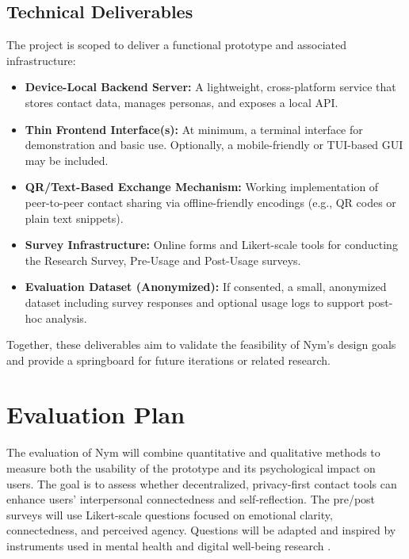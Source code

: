 \documentclass{imc-inf}
\begin{document}
\section{Technical Deliverables}

The project is scoped to deliver a functional prototype and associated infrastructure:

\begin{itemize}
  \item \textbf{Device-Local Backend Server:} A lightweight, cross-platform service that stores contact data, manages personas, and exposes a local API.
  \item \textbf{Thin Frontend Interface(s):} At minimum, a terminal interface for demonstration and basic use. Optionally, a mobile-friendly or TUI-based GUI may be included.
  \item \textbf{QR/Text-Based Exchange Mechanism:} Working implementation of peer-to-peer contact sharing via offline-friendly encodings (e.g., QR codes or plain text snippets).
  \item \textbf{Survey Infrastructure:} Online forms and Likert-scale tools for conducting the Research Survey, Pre-Usage and Post-Usage surveys.
  \item \textbf{Evaluation Dataset (Anonymized):} If consented, a small, anonymized dataset including survey responses and optional usage logs to support post-hoc analysis.
\end{itemize}

Together, these deliverables aim to validate the feasibility of Nym’s design goals and provide a springboard for future iterations or related research.



\chapter{Evaluation Plan}

The evaluation of Nym will combine quantitative and qualitative methods to measure both the usability of the prototype and its psychological impact on users. The goal is to assess whether decentralized, privacy-first contact tools can enhance users’ interpersonal connectedness and self-reflection.
The pre/post surveys will use Likert-scale questions focused on emotional clarity, connectedness, and perceived agency. Questions will be adapted and inspired by instruments used in mental health and digital well-being research \cite{batterham2020mental}.
\end{document}
